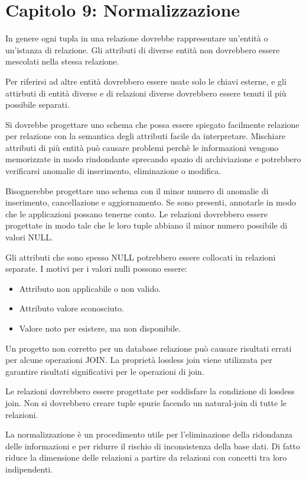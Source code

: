 \documentclass{article}
\begin{document}
\section{Capitolo 9: Normalizzazione}
In genere ogni tupla in una relazione dovrebbe rappresentare un'entità o un'istanza di relazione. Gli attributi di diverse entità non dovrebbero essere mescolati nella stessa relazione.

\noindent Per riferirsi ad altre entità dovrebbero essere usate solo le chiavi esterne, e gli attirbuti di entità diverse e di relazioni diverse dovrebbero essere tenuti il più possibile separati.

\noindent Si dovrebbe progettare uno schema che possa essere spiegato facilmente relazione per relazione con la semantica degli attributi facile da interpretare. Mischiare attributi di più entità può causare problemi perchè le informazioni vengono memorizzate in modo rindondante sprecando spazio di archiviazione e potrebbero verificarsi anomalie di inserimento, eliminazione o modifica.

\noindent Bisognerebbe progettare uno schema con il minor numero di anomalie di inserimento, cancellazione e aggiornamento. Se sono presenti, annotarle in modo che le applicazioni possano tenerne conto. Le relazioni dovrebbero essere progettate in modo tale che le loro tuple abbiano il minor numero possibile di valori NULL. 

\noindent Gli attributi che sono spesso NULL potrebbero essere collocati in relazioni separate. I motivi per i valori nulli possono essere:
\begin{itemize}
    \item Attributo non applicabile o non valido.
    \item Attributo valore sconosciuto.
    \item Valore noto per esistere, ma non disponibile.
\end{itemize}
\noindent Un progetto non corretto per un database relazione può causare risultati errati per alcune operazioni JOIN. La proprietà lossless join viene utilizzata per garantire risultati significativi per le operazioni di join.

\noindent Le relazioni dovrebbero essere progettate per soddisfare la condizione di lossless join. Non si dovrebbero creare tuple spurie facendo un natural-join di tutte le relazioni. 

\noindent La normalizzazione è un procedimento utile per l'eliminazione della ridondanza delle informazioni e per ridurre il rischio di inconsistenza della base dati. Di fatto riduce la dimensione delle relazioni a partire da relazioni con concetti tra loro indipendenti. 
\end{document}
